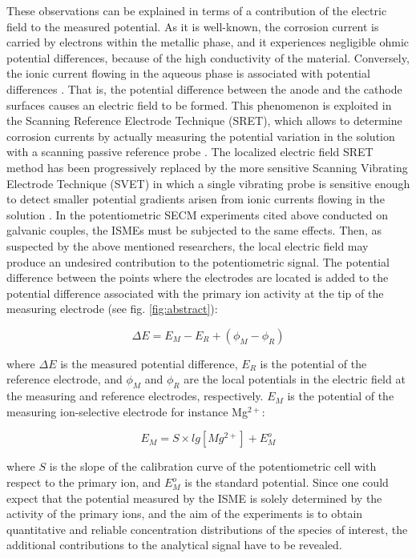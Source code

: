 \documentclass[3p]{elsarticle}
\begin{document}
These observations can be explained in terms of a contribution of the electric field to the measured potential. As it is well-known, the corrosion current is carried by electrons within the metallic phase, and it experiences negligible ohmic potential differences, because of the high conductivity of the material. Conversely, the ionic current flowing in the aqueous phase is associated with potential differences \cite{Isaacsfield}. 
That is, the potential difference between the anode and the cathode surfaces causes an electric field to be formed. 
This phenomenon is exploited in the Scanning Reference Electrode Technique (SRET), which allows to determine corrosion currents by actually measuring the potential variation in the solution with a scanning passive reference probe \cite{SRET1, SRET2, SRET3, SRET4}. 
The localized electric field SRET method has been progressively replaced by the more sensitive Scanning Vibrating Electrode Technique (SVET) in which a single vibrating probe is sensitive enough to detect smaller potential gradients arisen from ionic currents flowing in the solution \cite{SVET}. 
In the potentiometric SECM experiments cited above conducted on galvanic couples, the ISMEs must be subjected to the same effects. Then, as suspected by the above mentioned researchers, the local electric field may produce an undesired contribution to the potentiometric signal. 
The potential difference between the points where the electrodes are located is added to the potential difference associated with the primary ion activity at the tip of the measuring electrode (see fig. \ref{fig:abstract}):

\begin{equation}
\Delta E=E_M-E_R + (\phi_M - \phi_R)
\label{eq:potential}
\end{equation}

where $\Delta E$ is the measured potential difference, $E_R$ is the potential of the reference electrode, and $\phi_M$ and $\phi_R$ are the local potentials in the electric field at the measuring and reference electrodes, respectively. $E_M$ is the potential of the measuring ion-selective electrode for instance Mg$^{2+}$:

\begin{equation}
E_M = S \times lg[Mg^{2+}] + E_M^o
\label{eq:measuring}
\end{equation}

where $S$ is the slope of the calibration curve of the potentiometric cell with respect to the primary ion, and $E_M^o$ is the standard potential.
Since one could expect that the potential measured by the ISME is solely determined by the activity of the primary ions, and the aim of the experiments is to obtain quantitative and reliable concentration distributions of the species of interest, the additional contributions to the analytical signal have to be revealed.
\end{document}
